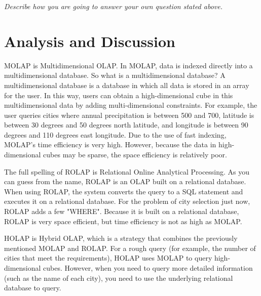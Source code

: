 \documentclass[12pt, a4paper]{article}
\begin{document}
{\emph{Describe how you are going to answer your own question stated above.}}

\section{Analysis and Discussion}

MOLAP is Multidimensional OLAP. In MOLAP, data is indexed directly into a multidimensional database. So what is a multidimensional database? A multidimensional database is a database in which all data is stored in an array for the user. In this way, users can obtain a high-dimensional cube in this multidimensional data by adding multi-dimensional constraints. For example, the user queries cities where annual precipitation is between 500 and 700, latitude is between 30 degrees and 50 degrees north latitude, and longitude is between 90 degrees and 110 degrees east longitude. Due to the use of fast indexing, MOLAP's time efficiency is very high. However, because the data in high-dimensional cubes may be sparse, the space efficiency is relatively poor.

The full spelling of ROLAP is Relational Online Analytical Processing. As you can guess from the name, ROLAP is an OLAP built on a relational database. When using ROLAP, the system converts the query to a SQL statement and executes it on a relational database. For the problem of city selection just now, ROLAP adds a few "WHERE". Because it is built on a relational database, ROLAP is very space efficient, but time efficiency is not as high as MOLAP.

HOLAP is Hybrid OLAP, which is a strategy that combines the previously mentioned MOLAP and ROLAP. For a rough query (for example, the number of cities that meet the requirements), HOLAP uses MOLAP to query high-dimensional cubes. However, when you need to query more detailed information (such as the name of each city), you need to use the underlying relational database to query.





\end{document}
